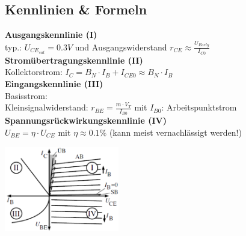 	\subsection{Kennlinien \& Formeln}
		\begin{minipage}[c]{12cm}
			{\bf Ausgangskennlinie (I)}\\
				typ.: $U_{CE_{sat}}=0.3V$ und Ausgangswiderstand $r_{CE} \approx \frac{U_{Early}}{I_{C0}}$\\
				\hspace{2mm}
			{\bf Stromübertragungskennlinie (II)}\\
				Kollektorstrom: $I_C = B_N \cdot I_B + I_{CE0} \approx B_N \cdot I_B$\\
				\hspace{2mm}	
			{\bf Eingangskennlinie (III)}\\
				Basisstrom: \\
				Kleinsignalwiderstand: $r_{BE} = \frac{m\cdot V_T}{I_{B0}}$ mit $I_{B0}$: Arbeitspunktstrom\\
				\hspace{2mm}
			{\bf Spannungsrückwirkungskennlinie (IV)}\\
				$U_{BE} = \eta \cdot U_{CE}$ mit $\eta \approx 0.1 \%$ (kann meist vernachlässigt werden!)\\
        \end{minipage}	
		\begin{minipage}[c]{5cm}
			\includegraphics[width=5cm]{./images/BipTraKennlinien.png}
		\end{minipage}
		
